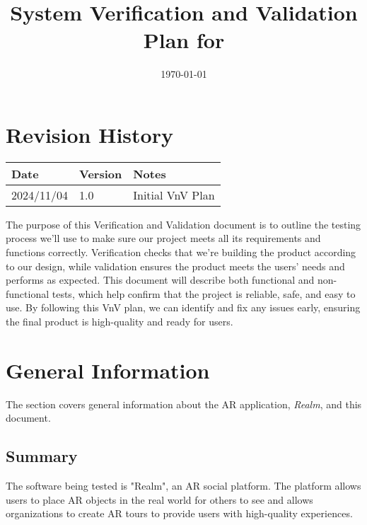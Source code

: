 \documentclass[12pt, titlepage]{article}
\begin{document}
\title{System Verification and Validation Plan for \progname{}}
\author{\authname}
\date{\today}

\maketitle


\section*{Revision History}

\begin{tabularx}{\textwidth}{p{3cm}p{2cm}X}
  \toprule {\bf Date} & {\bf Version} & {\bf Notes}      \\
  \midrule
  2024/11/04          & 1.0           & Initial VnV Plan \\
  \bottomrule
\end{tabularx}

\newpage

\tableofcontents

\listoftables

\newpage


The purpose of this Verification and Validation document is to outline the testing process we'll use to make sure our project meets all its requirements and functions correctly. Verification checks that we're building the product according to our design, while validation ensures the product meets the users' needs and performs as expected. This document will describe both functional and non-functional tests, which help confirm that the project is reliable, safe, and easy to use. By following this VnV plan, we can identify and fix any issues early, ensuring the final product is high-quality and ready for users.

\section{General Information}
The section covers general information about the AR application, \textit{Realm}, and this document.

\subsection{Summary}

The software being tested is "Realm", an AR social platform. The platform allows users to place AR objects in the real world for others to see and allows organizations to create AR tours to provide users with high-quality experiences.
\end{document}
